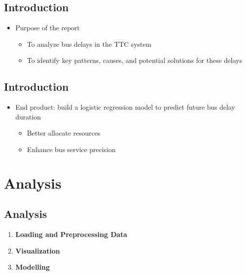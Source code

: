 \documentclass[
  letterpaper,
  DIV=11,
  numbers=noendperiod]{scrartcl}
\providecommand{\tightlist}{%
  \setlength{\itemsep}{0pt}\setlength{\parskip}{0pt}}\usepackage{longtable,booktabs,array}
\begin{document}
\subsection{Introduction}\label{introduction-3}

\begin{itemize}
\tightlist
\item
  Purpose of the report

  \begin{itemize}
  \tightlist
  \item
    To analyze bus delays in the TTC system
  \item
    To identify key patterns, causes, and potential solutions for these
    delays
  \end{itemize}
\end{itemize}

\subsection{Introduction}\label{introduction-4}

\begin{itemize}
\tightlist
\item
  End product: build a logistic regression model to predict future bus
  delay duration

  \begin{itemize}
  \tightlist
  \item
    Better allocate resources
  \item
    Enhance bus service precision
  \end{itemize}
\end{itemize}

\section{Analysis}\label{analysis}

\subsection{Analysis}\label{analysis-1}

\begin{enumerate}
\def\labelenumi{\arabic{enumi}.}
\tightlist
\item
  \textbf{Loading and Preprocessing Data}
\item
  \textbf{Visualization}
\item
  \textbf{Modelling}
\end{enumerate}
\end{document}
